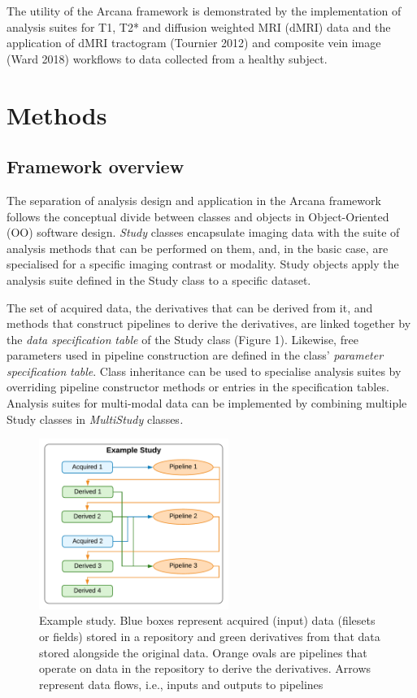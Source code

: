 The utility of the Arcana framework is demonstrated by the
implementation of analysis suites for T1, T2* and diffusion weighted MRI
(dMRI) data and the application of dMRI tractogram (Tournier 2012) and
composite vein image (Ward 2018) workflows to data collected from a
healthy subject.

\section{Methods}
\label{methods}

\subsection{Framework overview}
\label{framework-overview}

The separation of analysis design and application in the Arcana
framework follows the conceptual divide between classes and objects in
Object-Oriented (OO) software design. \emph{Study} classes encapsulate
imaging data with the suite of analysis methods that can be performed on
them, and, in the basic case, are specialised for a specific imaging
contrast or modality. Study objects apply the analysis suite defined in
the Study class to a specific dataset.

The set of acquired data, the derivatives that can be derived from it,
and methods that construct pipelines to derive the derivatives, are
linked together by the \emph{data specification} \emph{table} of the
Study class (Figure 1). Likewise, free parameters used in pipeline
construction are defined in the class' \emph{parameter specification}
\emph{table}. Class inheritance can be used to specialise analysis
suites by overriding pipeline constructor methods or entries in the
specification tables. Analysis suites for multi-modal data can be
implemented by combining multiple Study classes in \emph{MultiStudy}
classes\emph{.}

\begin{figure}
  \begin{center}
    \includegraphics[width=0.55\textwidth]{figures/example_study}
  \caption{Example study. Blue boxes represent acquired (input)
data (filesets or fields) stored in a repository and green derivatives
from that data stored alongside the original data. Orange ovals are
pipelines that operate on data in the repository to derive the
derivatives. Arrows represent data flows, i.e., inputs and outputs to
pipelines}
  \end{center}
\label{fig:example_study}
\end{figure}

